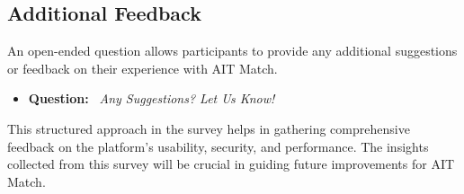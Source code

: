 \subsection{Additional Feedback}

An open-ended question allows participants to provide any additional suggestions or feedback on their experience with AIT Match.

\begin{itemize}
\item \textbf{Question:} \
\textit{Any Suggestions? Let Us Know!}
\end{itemize}

This structured approach in the survey helps in gathering comprehensive feedback on the platform’s usability, security, and performance. The insights collected from this survey will be crucial in guiding future improvements for AIT Match.
